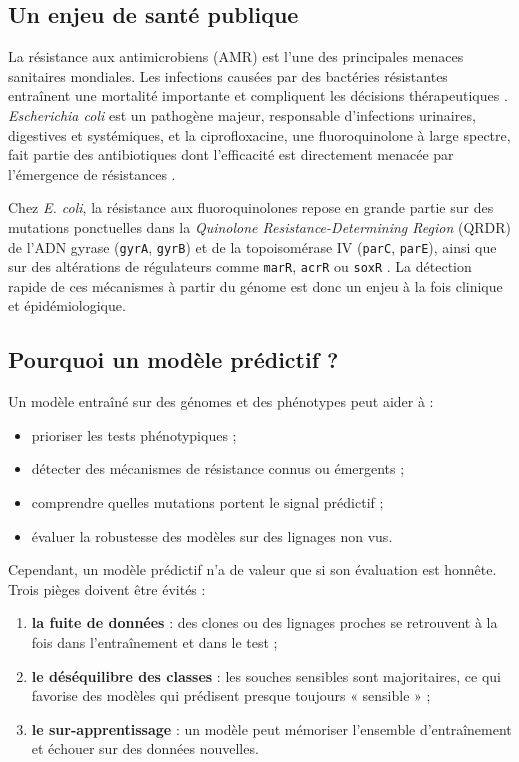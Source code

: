 \documentclass[11pt,a4paper]{article}
\begin{document}
\subsection{Un enjeu de santé publique}

La résistance aux antimicrobiens (AMR) est l'une des principales menaces sanitaires mondiales. Les infections causées par des bactéries résistantes entraînent une mortalité importante et compliquent les décisions thérapeutiques \citep{murray2022global}. \textit{Escherichia coli} est un pathogène majeur, responsable d'infections urinaires, digestives et systémiques, et la ciprofloxacine, une fluoroquinolone à large spectre, fait partie des antibiotiques dont l'efficacité est directement menacée par l'émergence de résistances \citep{hooper2016}.

Chez \textit{E. coli}, la résistance aux fluoroquinolones repose en grande partie sur des mutations ponctuelles dans la \textit{Quinolone Resistance-Determining Region} (QRDR) de l'ADN gyrase (\texttt{gyrA}, \texttt{gyrB}) et de la topoisomérase IV (\texttt{parC}, \texttt{parE}), ainsi que sur des altérations de régulateurs comme \texttt{marR}, \texttt{acrR} ou \texttt{soxR} \citep{aldred2014}. La détection rapide de ces mécanismes à partir du génome est donc un enjeu à la fois clinique et épidémiologique.

\subsection{Pourquoi un modèle prédictif ?}

Un modèle entraîné sur des génomes et des phénotypes peut aider à :
\begin{itemize}[leftmargin=1.2em]
    \item prioriser les tests phénotypiques ;
    \item détecter des mécanismes de résistance connus ou émergents ;
    \item comprendre quelles mutations portent le signal prédictif ;
    \item évaluer la robustesse des modèles sur des lignages non vus.
\end{itemize}

Cependant, un modèle prédictif n'a de valeur que si son évaluation est honnête. Trois pièges doivent être évités :
\begin{enumerate}[leftmargin=1.4em]
    \item \textbf{la fuite de données} : des clones ou des lignages proches se retrouvent à la fois dans l'entraînement et dans le test ;
    \item \textbf{le déséquilibre des classes} : les souches sensibles sont majoritaires, ce qui favorise des modèles qui prédisent presque toujours « sensible » ;
    \item \textbf{le sur-apprentissage} : un modèle peut mémoriser l'ensemble d'entraînement et échouer sur des données nouvelles.
\end{enumerate}
\end{document}
